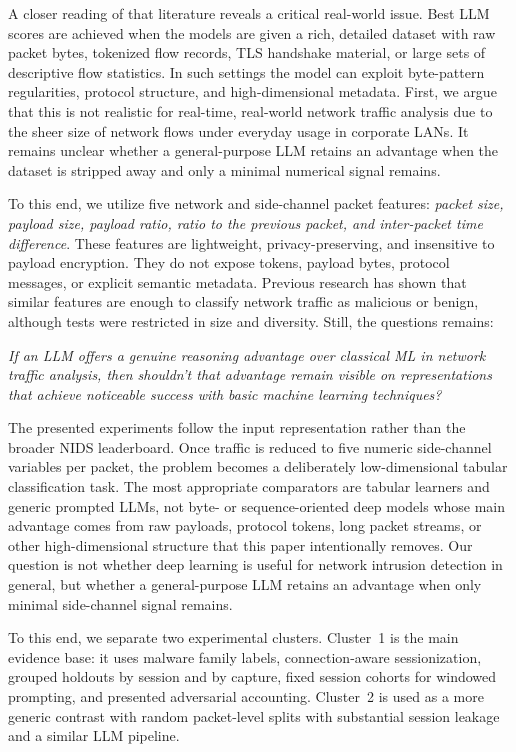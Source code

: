 \documentclass[conference]{IEEEtran}
\begin{document}
A closer reading of that literature reveals a critical real-world issue. Best LLM scores are achieved when the models are given a rich, detailed dataset with raw packet bytes, tokenized flow records, TLS handshake material, or large sets of descriptive flow statistics. In such settings the model can exploit byte-pattern regularities, protocol structure, and high-dimensional metadata. First, we argue that this is not realistic for real-time, real-world network traffic analysis due to the sheer size of network flows under everyday usage in corporate LANs. It remains unclear whether a general-purpose LLM retains an advantage when the dataset is stripped away and only a minimal numerical signal remains.

To this end, we utilize five network and side-channel packet features: \textit{packet size, payload size, payload ratio, ratio to the previous packet, and inter-packet time difference}. These features are lightweight, privacy-preserving, and insensitive to payload encryption. They do not expose tokens, payload bytes, protocol messages, or explicit semantic metadata. Previous research \cite{stergiopoulos2018side,sharafaldin2018toward} has shown that similar features are enough to classify network traffic as malicious or benign, although tests were restricted in size and diversity. Still, the questions remains: 

\textit{If an LLM offers a genuine reasoning advantage over classical ML in network traffic analysis, then shouldn't that advantage remain visible on representations that achieve noticeable success with basic machine learning techniques?}

The presented experiments follow the input representation rather than the broader NIDS leaderboard. Once traffic is reduced to five numeric side-channel variables per packet, the problem becomes a deliberately low-dimensional tabular classification task. The most appropriate comparators are tabular learners and generic prompted LLMs, not byte- or sequence-oriented deep models whose main advantage comes from raw payloads, protocol tokens, long packet streams, or other high-dimensional structure that this paper intentionally removes. Our question is not whether deep learning is useful for network intrusion detection in general, but whether a general-purpose LLM retains an advantage when only minimal side-channel signal remains.

To this end, we separate two experimental clusters. Cluster~1 is the main evidence base: it uses malware family labels, connection-aware sessionization, grouped holdouts by session and by capture, fixed session cohorts for windowed prompting, and presented adversarial accounting. Cluster~2 is used as a more generic contrast with random packet-level splits with substantial session leakage and a similar LLM pipeline. 
\end{document}
